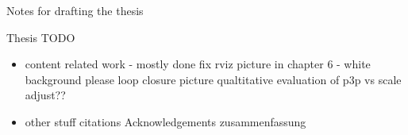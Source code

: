 \clearemptydoublepage

{}

\begin{center}
	\huge{Notes for drafting the thesis}
\end{center}


Thesis TODO
\begin{itemize}
\item content
\subitem related work - mostly done
\subitem fix rviz picture in chapter 6 - white background please
\subitem loop closure picture
\subitem qualtitative evaluation of p3p vs scale adjust??
\item other stuff
\subitem citations
\subitem Acknowledgements
\subitem zusammenfassung
\end{itemize}

